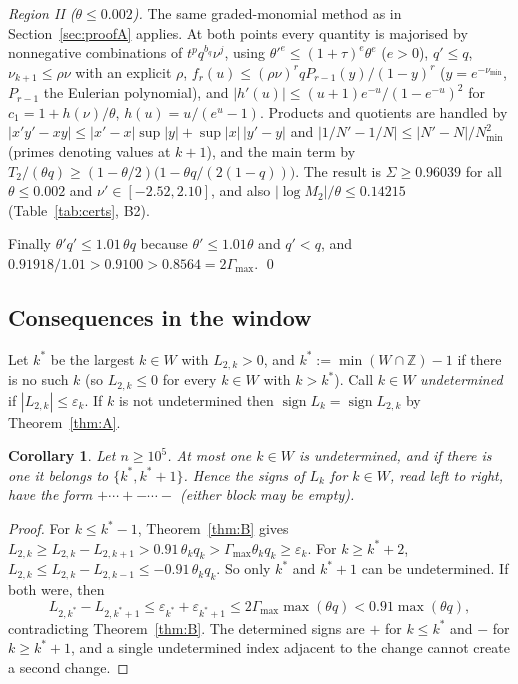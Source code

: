 \documentclass[11pt]{amsart}
\newtheorem{corollary}[theorem]{Corollary}
\theoremstyle{definition}
\theoremstyle{remark}
\numberwithin{equation}{section}
\newcommand{\ZZ}{\mathbb{Z}}
\begin{document}
\emph{Region II ($\theta\le0.002$).} The same graded-monomial method as in Section~\ref{sec:proofA} applies. At both points every
quantity is majorised by nonnegative combinations of $t^pq^{b_q}\nu^j$, using $\theta'^e\le(1+\tau)^e\theta^e$ ($e>0$), $q'\le q$,
$\nu_{k+1}\le\rho\nu$ with an explicit $\rho$, $f_r(u)\le(\rho\nu)^rqP_{r-1}(y)/(1-y)^r$ ($y=e^{-\nu_{\min}}$, $P_{r-1}$ the Eulerian
polynomial), and $|h'(u)|\le(u+1)e^{-u}/(1-e^{-u})^2$ for $c_1=1+h(\nu)/\theta$, $h(u)=u/(e^u-1)$. Products and quotients are
handled by $|x'y'-xy|\le|x'-x|\sup|y|+\sup|x|\,|y'-y|$ and $|1/N'-1/N|\le|N'-N|/N_{\min}^2$ (primes denoting values at $k+1$), and the main term by
$T_2/(\theta q)\ge(1-\theta/2)\bigl(1-\theta q/(2(1-q))\bigr)$. The result is $\Sigma\ge0.96039$ for all $\theta\le0.002$ and
$\nu'\in[-2.52,2.10]$, and also $|\log M_2|/\theta\le0.14215$ (Table~\ref{tab:certs}, B2).

Finally $\theta'q'\le1.01\,\theta q$ because $\theta'\le1.01\theta$ and $q'<q$, and $0.91918/1.01>0.9100>0.8564=2\Gamma_{\max}$. \qed

\subsection{Consequences in the window}
Let $k^\ast$ be the largest $k\in W$ with $L_{2,k}>0$, and $k^\ast:=\min(W\cap\ZZ)-1$ if there is no such $k$ (so $L_{2,k}\le0$ for every $k\in W$ with $k>k^\ast$). Call $k\in W$
\emph{undetermined} if $|L_{2,k}|\le\varepsilon_k$. If $k$ is not undetermined then $\operatorname{sign}L_k=\operatorname{sign}L_{2,k}$
by Theorem~\ref{thm:A}.

\begin{corollary}\label{cor:onek}
Let $n\ge10^5$. At most one $k\in W$ is undetermined, and if there is one it belongs to $\{k^\ast,k^\ast+1\}$. Hence the signs of
$L_k$ for $k\in W$, read left to right, have the form $+\cdots+-\cdots-$ (either block may be empty).
\end{corollary}

\begin{proof}
For $k\le k^\ast-1$, Theorem~\ref{thm:B} gives $L_{2,k}\ge L_{2,k}-L_{2,k+1}>0.91\,\theta_kq_k>\Gamma_{\max}\theta_kq_k\ge\varepsilon_k$.
For $k\ge k^\ast+2$, $L_{2,k}\le L_{2,k}-L_{2,k-1}\le-0.91\,\theta_kq_k$. So only $k^\ast$ and $k^\ast+1$ can be undetermined. If both
were, then
\[
  L_{2,k^\ast}-L_{2,k^\ast+1}\le\varepsilon_{k^\ast}+\varepsilon_{k^\ast+1}\le2\Gamma_{\max}\max(\theta q)<0.91\max(\theta q),
\]
contradicting Theorem~\ref{thm:B}. The determined signs are $+$ for $k\le k^\ast$ and $-$ for $k\ge k^\ast+1$, and a single undetermined
index adjacent to the change cannot create a second change.
\end{proof}
\end{document}

